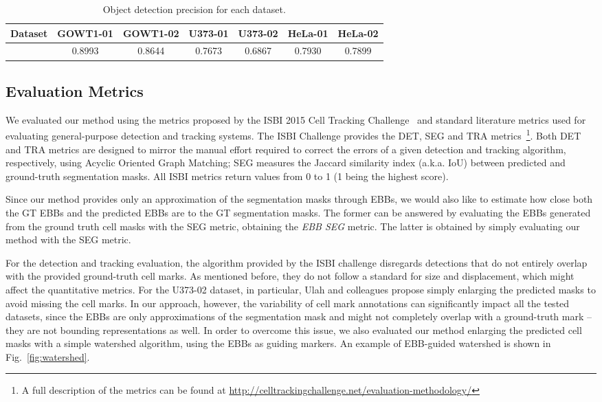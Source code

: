 \documentclass{article}
\begin{document}
\begin{table}[]
    \caption{Object detection precision  for each dataset.}
    \centering
    \begin{tabular}{c|c|c|c|c|c|c}
        \textbf{Dataset} & GOWT1-01 & GOWT1-02 & U373-01 & U373-02 & HeLa-01 & HeLa-02 \\ \hline
         &  0.8993 & 0.8644 & 0.7673 & 0.6867 & 0.7930 & 0.7899
    \end{tabular}
\label{tab:alpha_values}
\end{table}

\subsection{Evaluation Metrics}\label{sec:metrics}

We evaluated our method using the metrics proposed by the ISBI 2015 Cell Tracking Challenge~\cite{isbi} and standard literature metrics used for evaluating general-purpose detection and tracking systems. The ISBI Challenge provides the DET, SEG and TRA metrics~\footnote{A full description of the metrics can be found at \url{http://celltrackingchallenge.net/evaluation-methodology/}}. Both DET and TRA metrics are designed to mirror the manual effort required to correct the errors of a given detection and tracking algorithm, respectively, using Acyclic Oriented Graph Matching; SEG measures the Jaccard similarity index (a.k.a. IoU) between predicted and ground-truth segmentation masks. All ISBI metrics return values from 0 to 1 (1 being the highest score). 

Since our method provides only an approximation of the segmentation masks through EBBs, we would also like to estimate how close both the GT EBBs and the predicted EBBs are to the GT segmentation masks. The former can be answered by evaluating the EBBs generated from the ground truth cell masks with the SEG metric, obtaining the \emph{EBB SEG} metric. The latter is obtained by simply evaluating our method with the SEG metric.

For the detection and tracking evaluation, the algorithm provided by the ISBI challenge disregards detections that do not entirely overlap with the provided ground-truth cell marks. As mentioned before, they do not follow a standard for size and displacement, which might affect the quantitative metrics. For the  U373-02 dataset, in particular,  Ulah and colleagues \cite{cpn} propose simply enlarging the predicted masks to avoid missing the cell marks. In our approach, however, the variability of cell mark annotations can significantly impact all the tested datasets, since the EBBs are only approximations of the segmentation mask and might not completely overlap with a ground-truth mark -- they are not bounding representations as well. In order to overcome this issue, we also evaluated our method enlarging the predicted cell masks with a simple watershed algorithm, using the EBBs as guiding markers. An example of EBB-guided watershed is shown in Fig.~\ref{fig:watershed}. 
\end{document}

